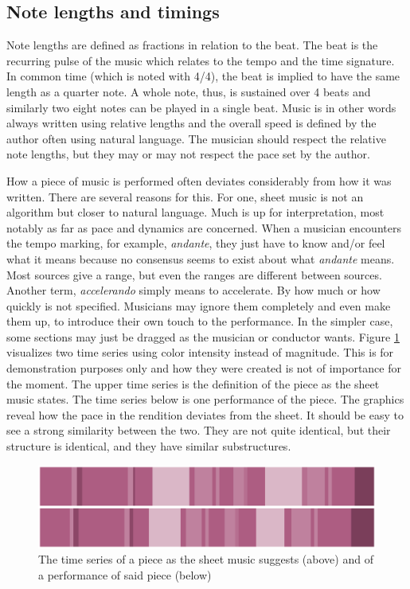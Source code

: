 \subsection{Note lengths and timings}
Note lengths are defined as fractions in relation to the beat. The beat is the recurring pulse of the music which relates to the tempo and the time signature. In common time (which is noted with 4/4), the beat is implied to have the same length as a quarter note. A whole note, thus, is sustained over 4 beats and similarly two eight notes can be played in a single beat. Music is in other words always written using relative lengths and the overall speed is defined by the author often using natural language. The musician should respect the relative note lengths, but they may or may not respect the pace set by the author.  

How a piece of music is performed often deviates considerably from how it was written. There are several reasons for this. For one, sheet music is not an algorithm but closer to natural language. Much is up for interpretation, most notably as far as pace and dynamics are concerned. When a musician encounters the tempo marking, for example, \textit{andante}, they just have to know and/or feel what it means because no consensus seems to exist about what \textit{andante} means. Most sources give a range, but even the ranges are different between sources. Another term, \textit{accelerando} simply means to accelerate. By how much or how quickly is not specified. Musicians may ignore them completely and even make them up, to introduce their own touch to the performance. In the simpler case, some sections may just be dragged as the musician or conductor wants. Figure \ref{fig:performance-sheet} visualizes two time series using color intensity instead of magnitude. This is for demonstration purposes only and how they were created is not of importance for the moment. The upper time series is the definition of the piece as the sheet music states. The time series below is one performance of the piece. The graphics reveal how the pace in the rendition deviates from the sheet. It should be easy to see a strong similarity between the two. They are not quite identical, but their structure is identical, and they have similar substructures. 

\begin{figure}[ht]
    \centering
    \includegraphics[width=\textwidth]{./images/performance-sheet.png}
    \caption{The time series of a piece as the sheet music suggests (above) and of a performance of said piece (below)\label{fig:performance-sheet}}
\end{figure}

